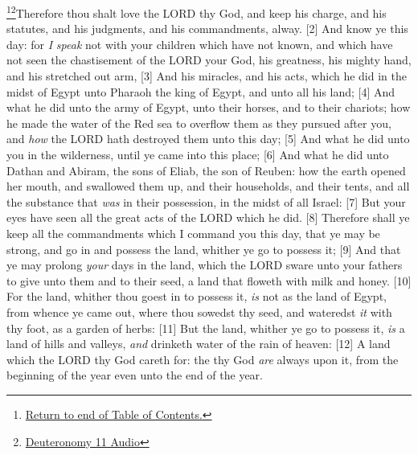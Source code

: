 \footnote{\textcolor[cmyk]{0.99998,1,0,0}{\hyperlink{TOC}{Return to end of Table of Contents.}}}\footnote{\href{https://audiobible.com/bible/deuteronomy_11.html}{\textcolor[cmyk]{0.99998,1,0,0}{Deuteronomy 11 Audio}}}\textcolor[cmyk]{0.99998,1,0,0}{Therefore thou shalt love the LORD thy God, and keep his charge, and his statutes, and his judgments, and his commandments, alway.}
[2] \textcolor[cmyk]{0.99998,1,0,0}{And know ye this day: for \emph{I} \emph{speak} not with your children which have not known, and which have not seen the chastisement of the LORD your God, his greatness, his mighty hand, and his stretched out arm,}
[3] \textcolor[cmyk]{0.99998,1,0,0}{And his miracles, and his acts, which he did in the midst of Egypt unto Pharaoh the king of Egypt, and unto all his land;}
[4] \textcolor[cmyk]{0.99998,1,0,0}{And what he did unto the army of Egypt, unto their horses, and to their chariots; how he made the water of the Red sea to overflow them as they pursued after you, and \emph{how} the LORD hath destroyed them unto this day;}
[5] \textcolor[cmyk]{0.99998,1,0,0}{And what he did unto you in the wilderness, until ye came into this place;}
[6] \textcolor[cmyk]{0.99998,1,0,0}{And what he did unto Dathan and Abiram, the sons of Eliab, the son of Reuben: how the earth opened her mouth, and swallowed them up, and their households, and their tents, and all the substance that \emph{was} in their possession, in the midst of all Israel:}
[7] \textcolor[cmyk]{0.99998,1,0,0}{But your eyes have seen all the great acts of the LORD which he did.}
[8] \textcolor[cmyk]{0.99998,1,0,0}{Therefore shall ye keep all the commandments which I command you this day, that ye may be strong, and go in and possess the land, whither ye go to possess it;}
[9] \textcolor[cmyk]{0.99998,1,0,0}{And that ye may prolong \emph{your} days in the land, which the LORD sware unto your fathers to give unto them and to their seed, a land that floweth with milk and honey.}
[10] \textcolor[cmyk]{0.99998,1,0,0}{For the land, whither thou goest in to possess it, \emph{is} not as the land of Egypt, from whence ye came out, where thou sowedst thy seed, and wateredst \emph{it} with thy foot, as a garden of herbs:}
[11] \textcolor[cmyk]{0.99998,1,0,0}{But the land, whither ye go to possess it, \emph{is} a land of hills and valleys, \emph{and} drinketh water of the rain of heaven:}
[12] \textcolor[cmyk]{0.99998,1,0,0}{A land which the LORD thy God careth for: the  thy God \emph{are} always upon it, from the beginning of the year even unto the end of the year.}
